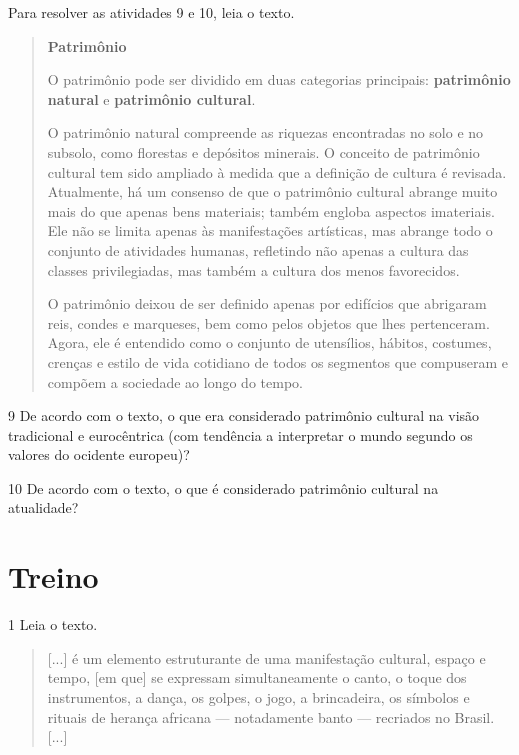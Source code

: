 Para resolver as atividades 9 e 10, leia o texto.

\begin{quote}
\textbf{Patrimônio}

O patrimônio pode ser dividido em duas categorias principais: \textbf{patrimônio 
natural} e \textbf{patrimônio cultural}.

O patrimônio natural compreende as riquezas encontradas no solo e no subsolo, 
como florestas e depósitos minerais. O conceito de patrimônio cultural tem sido 
ampliado à medida que a definição de cultura é revisada. Atualmente, há um 
consenso de que o patrimônio cultural abrange muito mais do que apenas bens 
materiais; também engloba aspectos imateriais. Ele não se limita apenas às 
manifestações artísticas, mas abrange todo o conjunto de atividades humanas, 
refletindo não apenas a cultura das classes privilegiadas, mas também a cultura 
dos menos favorecidos.

O patrimônio deixou de ser definido apenas por edifícios que abrigaram reis, condes 
e marqueses, bem como pelos objetos que lhes pertenceram. Agora, ele é entendido 
como o conjunto de utensílios, hábitos, costumes, crenças e estilo de vida cotidiano 
de todos os segmentos que compuseram e compõem a sociedade ao longo do tempo.

\end{quote}

\num{9} De acordo com o texto, o que era considerado patrimônio cultural na
  visão tradicional e eurocêntrica (com tendência a interpretar o mundo
  segundo os valores do ocidente europeu)?


\num{10} De acordo com o texto, o que é considerado patrimônio cultural na
  atualidade?


\section{Treino}

\num{1} Leia o texto.

\begin{quote}
{[}...{]} é um elemento estruturante de uma manifestação cultural, espaço e tempo, 
[em que] se expressam simultaneamente o canto, o toque dos instrumentos, a dança, 
os golpes, o jogo, a brincadeira, os símbolos e rituais de herança africana 
--- notadamente banto --- recriados no Brasil. {[}...{]}

\end{quote}
  
